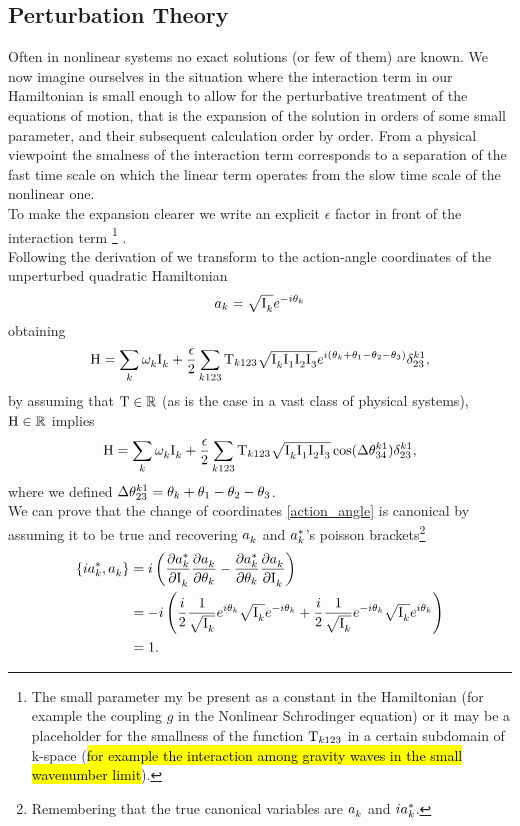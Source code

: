 \subsection{Perturbation Theory}

Often in nonlinear systems no exact solutions (or few of them) are known. We now imagine ourselves in the situation where the interaction term in our Hamiltonian 
is small enough to allow for the perturbative treatment of the equations of motion, that is the expansion of the solution in orders of some small parameter, 
and their subsequent calculation order by order. From a physical viewpoint the smalness of the interaction term corresponds to a 
separation of the fast time scale on which the linear term operates from the slow time scale of the nonlinear one.\\
 To make the expansion clearer we write an explicit $\epsilon$ factor in front of the interaction term
\footnote{The small parameter my be present as a constant in the Hamiltonian (for example the coupling $g$ in the Nonlinear Schrodinger equation) or 
it may be a placeholder for the smallness of the function $\mathrm{T}_{k123}$ in a certain subdomain of k-space (\hl{for example the interaction among gravity waves in 
the small wavenumber limit}). } . \\

Following the derivation of \cite{Onorato2020} we transform to the action-angle coordinates of the unperturbed quadratic Hamiltonian
\begin{equation}
    a_k = \sqrt{\mathrm{I}^{}_k}e^{-i\theta_k}
    \label{action_angle}
\end{equation} 
obtaining 
\begin{equation}
    \mathrm{H} = \sum_k \omega^{}_k \mathrm{I}^{}_k + \frac{\epsilon}{2} \sum_{k123}\mathrm{T}_{k123}\sqrt{\mathrm{I}^{}_k\mathrm{I}^{}_1\mathrm{I}^{}_2\mathrm{I}^{}_3}e^{i(\theta_k + \theta_1 - \theta_2 - \theta_3)}\delta^{k1}_{23},
\end{equation}
by assuming that $\mathrm{T} \in \mathbb{R}$ (as is the case in a vast class of physical systems), $\mathrm{H} \in \mathbb{R}$ implies 
\begin{equation}
    \mathrm{H} = \sum_k \omega^{}_k \mathrm{I}^{}_k + \frac{\epsilon}{2} \sum_{k123}\mathrm{T}_{k123}\sqrt{\mathrm{I}^{}_k\mathrm{I}^{}_1\mathrm{I}^{}_2\mathrm{I}^{}_3}\cos(\Delta\theta^{k1}_{34})\delta^{k1}_{23},
\end{equation}
where we defined $\Delta\theta^{k1}_{23}=\theta_k + \theta_1 - \theta_2 - \theta_3$. \\
We can prove that the change of coordinates \eqref{action_angle} is canonical by assuming it to be true and recovering $a_k^{}$ and $a_k^{*}$'s poisson 
brackets\footnote{Remembering that the true canonical variables are $a_k^{}$ and $ia_k^{*}$.} 
\begin{align}
    \left\{ ia_k^{*}, a_k^{} \right\} &= i \left( \frac{\partial a_k^{*}}{\partial \mathrm{I}^{}_k}\frac{\partial a_k^{}}{\partial \theta_k}  -
    \frac{\partial a_k^{*}}{\partial \theta_k}\frac{\partial a_k^{}}{\partial \mathrm{I}^{}_k}  \right) \\
    &= - i \left( \frac{i}{2} \frac{1}{\sqrt{\mathrm{I}^{}_k}}e^{i\theta_k}\sqrt{\mathrm{I}^{}_k}e^{-i\theta_k} + 
    \frac{i}{2} \frac{1}{\sqrt{\mathrm{I}^{}_k}}e^{-i\theta_k}\sqrt{\mathrm{I}^{}_k}e^{i\theta_k}\right) \\
    &= 1 .
\end{align} 

